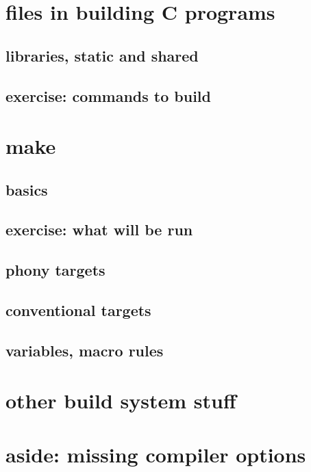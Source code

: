 
\section{files in building C programs}



\subsection{libraries, static and shared}



\subsection{exercise: commands to build}



\section{make}

\subsection{basics}



\subsection{exercise: what will be run}



\subsection{phony targets}



\subsection{conventional targets}



\subsection{variables, macro rules}



\section{other build system stuff}



\section{aside: missing compiler options}




